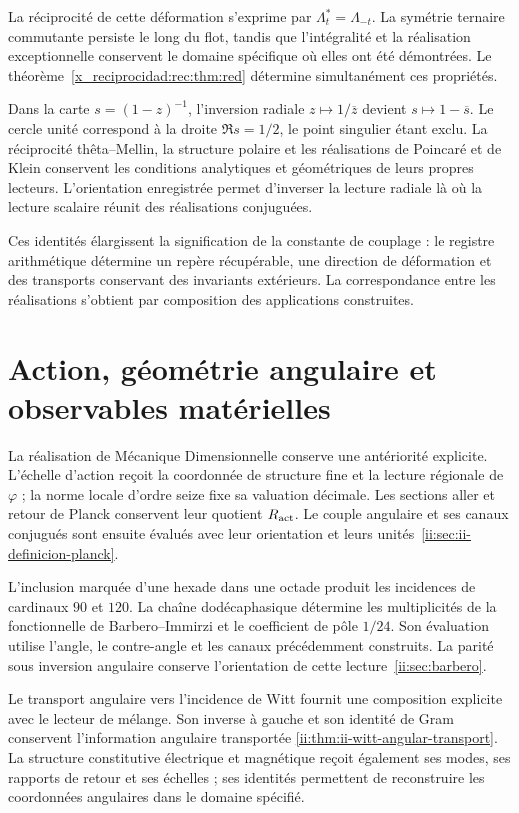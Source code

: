 La réciprocité de cette déformation s’exprime par \(\Lambda_t^*=\Lambda_{-t}\). La symétrie ternaire commutante persiste le long du flot, tandis que l’intégralité et la réalisation exceptionnelle conservent le domaine spécifique où elles ont été démontrées. Le théorème~\ref{x_reciprocidad:rec:thm:red} détermine simultanément ces propriétés.

Dans la carte \(s=(1-z)^{-1}\), l’inversion radiale \(z\mapsto1/\overline z\) devient \(s\mapsto1-\overline s\). Le cercle unité correspond à la droite \(\Re s=1/2\), le point singulier étant exclu. La réciprocité thêta--Mellin, la structure polaire et les réalisations de Poincaré et de Klein conservent les conditions analytiques et géométriques de leurs propres lecteurs. L’orientation enregistrée permet d’inverser la lecture radiale là où la lecture scalaire réunit des réalisations conjuguées.

Ces identités élargissent la signification de la constante de couplage : le registre arithmétique détermine un repère récupérable, une direction de déformation et des transports conservant des invariants extérieurs. La correspondance entre les réalisations s’obtient par composition des applications construites.

\section{Action, géométrie angulaire et observables matérielles}

La réalisation de Mécanique Dimensionnelle conserve une antériorité explicite. L’échelle d’action reçoit la coordonnée de structure fine et la lecture régionale de \(\varphi\) ; la norme locale d’ordre seize fixe sa valuation décimale. Les sections aller et retour de Planck conservent leur quotient \(R_{\rm act}\). Le couple angulaire et ses canaux conjugués sont ensuite évalués avec leur orientation et leurs unités~\ref{ii:sec:ii-definicion-planck}.

L’inclusion marquée d’une hexade dans une octade produit les incidences de cardinaux \(90\) et \(120\). La chaîne dodécaphasique détermine les multiplicités de la fonctionnelle de Barbero--Immirzi et le coefficient de pôle \(1/24\). Son évaluation utilise l’angle, le contre-angle et les canaux précédemment construits. La parité sous inversion angulaire conserve l’orientation de cette lecture~\ref{ii:sec:barbero}.

Le transport angulaire vers l’incidence de Witt fournit une composition explicite avec le lecteur de mélange. Son inverse à gauche et son identité de Gram conservent l’information angulaire transportée \ref{ii:thm:ii-witt-angular-transport}. La structure constitutive électrique et magnétique reçoit également ses modes, ses rapports de retour et ses échelles ; ses identités permettent de reconstruire les coordonnées angulaires dans le domaine spécifié.


